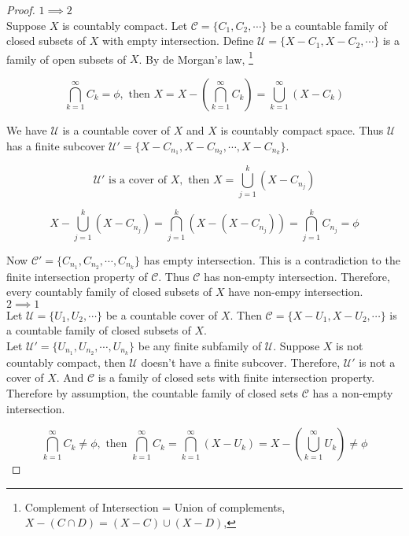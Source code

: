 \begin{proof}
	$1 \implies 2$\\
	Suppose $X$ is countably compact. Let $\mathcal{C} = \{C_1,C_2,\cdots\}$ be a countable family of closed subsets of $X$ with empty intersection. Define $\mathcal{U} = \{X-C_1, X-C_2, \cdots \}$ is a family of open subsets of $X$. By de Morgan's law, \footnote{Complement of Intersection = Union of complements, $X - (C \cap D) = (X-C) \cup (X-D)$, }

	$$\bigcap_{k = 1}^\infty C_k = \phi, \text{ then } X =  X - \left(\bigcap_{k = 1}^\infty C_k\right) = \bigcup_{k = 1}^\infty (X-C_k)$$

	We have $\mathcal{U}$ is a countable cover of $X$ and $X$ is countably compact space. Thus $\mathcal{U}$ has a finite subcover $\mathcal{U}' = \{X-C_{n_1},X-C_{n_2},\cdots,X-C_{n_k}\}$.

	$$ \mathcal{U}' \text{ is a cover of } X, \text{ then } X = \bigcup_{j = 1}^k \left( X-C_{n_j} \right)$$

	$$X - \bigcup_{j = 1}^k \left( X-C_{n_j} \right) = \bigcap_{j = 1}^k \left( X - \left( X - C_{n_j} \right) \right) = \bigcap_{j = 1}^k C_{n_j} = \phi $$

	Now $\mathcal{C}' = \{ C_{n_1},C_{n_2},\cdots,C_{n_k}\}$ has empty intersection. This is a contradiction to the finite intersection property of $\mathcal{C}$. Thus $\mathcal{C}$ has non-empty intersection. Therefore, every countably family of closed subsets of $X$ have non-empy intersection.\\

	$2 \implies 1$\\

	Let $\mathcal{U}=\{ U_1, U_2, \cdots \}$ be a countable cover of $X$. Then $\mathcal{C} = \{ X-U_1,X-U_2,\cdots \}$ is a countable family of closed subsets of $X$.\\

	Let $\mathcal{U}'= \{ U_{n_1},U_{n_2},\cdots,U_{n_k}\}$ be any finite subfamily of $\mathcal{U}$. Suppose $X$ is not countably compact, then $\mathcal{U}$ doesn't have a finite subcover. Therefore, $\mathcal{U}'$ is not a cover of $X$. And $\mathcal{C}$ is a family of closed sets with finite intersection property.\\

	Therefore by assumption, the countable family of closed sets $\mathcal{C}$ has a non-empty intersection.

	$$ \bigcap_{k=1}^\infty C_k \ne \phi, \text{ then } \bigcap_{k=1}^\infty C_k = \bigcap_{k=1}^\infty \left( X - U_k \right) = X - \left( \bigcup_{k=1}^\infty U_k \right) \ne \phi $$


\end{proof}
